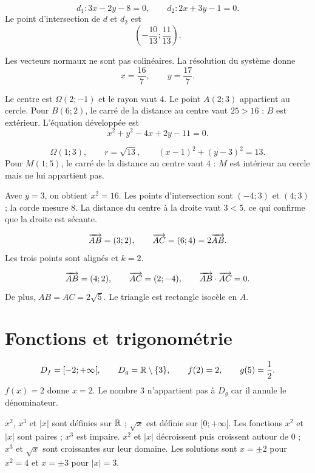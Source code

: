 \[
 d_1:3x-2y-8=0,\qquad d_2:2x+3y-1=0.
\]
Le point d'intersection de $d$ et $d_2$ est
\[
 \left(-\frac{10}{13};\frac{11}{13}\right).
\]

Les vecteurs normaux ne sont pas colinéaires. La résolution du système donne
\[
 x=\frac{16}{7},\qquad y=\frac{17}{7}.
\]

Le centre est $\Omega(2;-1)$ et le rayon vaut $4$. Le point $A(2;3)$
appartient au cercle. Pour $B(6;2)$, le carré de la distance au centre vaut
$25>16$ : $B$ est extérieur. L'équation développée est
\[
 x^2+y^2-4x+2y-11=0.
\]

\[
\Omega(1;3),\qquad r=\sqrt{13},\qquad
(x-1)^2+(y-3)^2=13.
\]
Pour $M(1;5)$, le carré de la distance au centre vaut $4$ : $M$ est intérieur
au cercle mais ne lui appartient pas.

Avec $y=3$, on obtient $x^2=16$. Les points d'intersection sont
$(-4;3)$ et $(4;3)$ ; la corde mesure $8$. La distance du centre à la droite
vaut $3<5$, ce qui confirme que la droite est sécante.

\[
\overrightarrow{AB}=(3;2),\qquad \overrightarrow{AC}=(6;4)=2\overrightarrow{AB}.
\]
Les trois points sont alignés et $k=2$.

\[
\overrightarrow{AB}=(4;2),\qquad \overrightarrow{AC}=(2;-4),\qquad
\overrightarrow{AB}\cdot\overrightarrow{AC}=0.
\]
De plus, $AB=AC=2\sqrt5$. Le triangle est rectangle isocèle en $A$.

\section*{Fonctions et trigonométrie}

\[
D_f=[-2;+\infty[,\qquad D_g=\mathbb{R}\setminus\{3\},\qquad
f(2)=2,\qquad g(5)=\frac12.
\]
$f(x)=2$ donne $x=2$. Le nombre $3$ n'appartient pas à $D_g$ car il annule
le dénominateur.

$x^2$, $x^3$ et $|x|$ sont définies sur $\mathbb{R}$ ; $\sqrt{x}$ est définie sur
$[0;+\infty[$. Les fonctions $x^2$ et $|x|$ sont paires ; $x^3$ est impaire.
$x^2$ et $|x|$ décroissent puis croissent autour de $0$ ; $x^3$ et
$\sqrt{x}$ sont croissantes sur leur domaine. Les solutions sont
$x=\pm2$ pour $x^2=4$ et $x=\pm3$ pour $|x|=3$.

